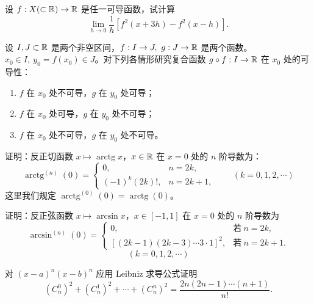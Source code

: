 \begin{exercise}
	\item 设 \(f:X(\subset\mathbb{R})\to\mathbb{R}\) 是任一可导函数，试计算
	\[
	\lim_{h\to0}\frac1h\left[f^2(x+3h)-f^2(x-h)\right].
	\]
\end{exercise}

\begin{exercise}
	\item 设 \(I,J\subset\mathbb{R}\) 是两个非空区间，\(f:I\to J,\ g:J\to\mathbb{R}\) 是两个函数。\(x_0\in I,\ y_0=f(x_0)\in J\)。对下列各情形研究复合函数 \(g\circ f:I\to\mathbb{R}\) 在 \(x_0\) 处的可导性：
	\begin{enumerate}[label=\arabic*)]
		\item \(f\) 在 \(x_0\) 处不可导，\(g\) 在 \(y_0\) 处可导；
		\item \(f\) 在 \(x_0\) 处可导，\(g\) 在 \(y_0\) 处不可导；
		\item \(f\) 在 \(x_0\) 处不可导，\(g\) 在 \(y_0\) 处不可导。
	\end{enumerate}
\end{exercise}

\begin{exercise}
	\item 证明：反正切函数 \(x\longmapsto\operatorname{arctg}x\)，\(x\in\mathbb{R}\) 在 \(x=0\) 处的 \(n\) 阶导数为：
	\[
	\operatorname{arctg}^{(n)}(0)=\begin{cases} 0, & n=2k, \\ (-1)^k(2k)!, & n=2k+1, \end{cases}\qquad(k=0,1,2,\cdots)
	\]
	这里我们规定 \(\operatorname{arctg}^{(0)}(0)=\operatorname{arctg}(0)\)。
\end{exercise}

\begin{exercise}
	\item 证明：反正弦函数 \(x\longmapsto\arcsin x\)，\(x\in[-1,1]\) 在 \(x=0\) 处的 \(n\) 阶导数为
	\[
	\arcsin^{(n)}(0)=\begin{cases} 0, & \text{若}\ n=2k, \\ [(2k-1)(2k-3)\cdots3\cdot1]^2, & \text{若}\ n=2k+1. \end{cases}
	\]
	\[
	(k=0,1,2,\cdots)
	\]
\end{exercise}

\begin{exercise}
	\item 对 \((x-a)^n(x-b)^n\) 应用 Leibniz 求导公式证明
	\[
	(C_n^0)^2+(C_n^1)^2+\cdots+(C_n^n)^2=\frac{2n(2n-1)\cdots(n+1)}{n!}.
	\]
\end{exercise}


